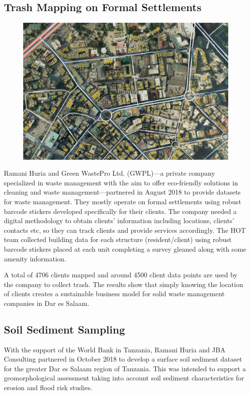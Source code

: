 \documentclass[a4paper,12pt,twoside]{article}
\begin{document}
\subsection{Trash Mapping on Formal Settlements}
\begin{figure}[h]
    \centering
    \includegraphics[width=.8\textwidth]{images/Trashmapsample.jpeg}
    \label{fig:my_label}
\end{figure}

Ramani Huria and Green WastePro Ltd. (GWPL)---a private company specialized in waste management with the aim to offer eco-friendly solutions in cleaning and waste management---partnered in August 2018 to provide datasets for waste management. They mostly operate on formal settlements using robust barcode stickers developed specifically for their clients. The company needed a digital methodology to obtain clients’ information including locations, clients' contacts etc, so they can track clients and provide services accordingly. The HOT team collected building data for each structure (resident/client) using robust barcode stickers placed at each unit completing a survey gleaned along with some amenity information. 

A total of 4706 clients mapped and around 4500 client data points are used by the company to collect trash. The results show that simply knowing the location of clients creates a sustainable business model  for solid waste management companies in Dar es Salaam. 

\newpage
\subsection{Soil Sediment Sampling}

With the support of the World Bank in Tanzania, Ramani Huria and JBA Consulting partnered in October 2018 to develop a surface soil sediment dataset for the greater Dar es Salaam region of Tanzania. This was intended to support a geomorphological assessment taking into account soil sediment characteristics for erosion and flood risk studies.
\end{document}

